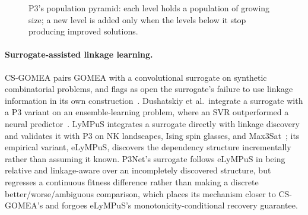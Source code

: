 \begin{figure}[t]
    \centering
    \caption{P3's population pyramid: each level holds a population of growing size; a new level is added only
    when the levels below it stop producing improved solutions.}
    \label{fig:p3-pyramid}
\end{figure}

\paragraph{Surrogate-assisted linkage learning.} CS-GOMEA pairs GOMEA with a convolutional surrogate on
synthetic combinatorial problems, and flags as open the surrogate's failure to use linkage information in its own
construction~\citep{dushatskiy2019csgomea}. Dushatskiy et al.\ integrate a surrogate with a P3 variant on an
ensemble-learning problem, where an SVR outperformed a neural
predictor~\citep{dushatskiy2021novelsurrogateassistedevolutionaryalgorithm}. LyMPuS integrates a surrogate
directly with linkage discovery and validates it with P3 on NK landscapes, Ising spin glasses, and
Max3Sat~\citep{przewozniczek2026lympus}; its empirical variant, eLyMPuS, discovers the dependency structure
incrementally rather than assuming it known. P3Net's surrogate follows eLyMPuS in being relative and
linkage-aware over an incompletely discovered structure, but regresses a continuous fitness difference rather
than making a discrete better/worse/ambiguous comparison, which places its mechanism closer to CS-GOMEA's and
forgoes eLyMPuS's monotonicity-conditional recovery guarantee.

